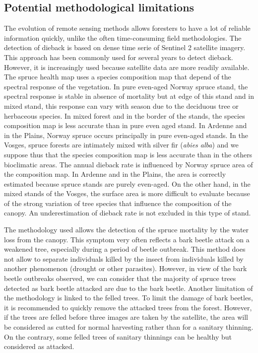 \documentclass[3p,procedia]{elsarticle}
\begin{document}
\subsection{Potential methodological limitations}
The evolution of remote sensing methods allows foresters to have a lot of reliable information quickly, unlike the often time-consuming field methodologies.
The detection of dieback is based on dense time serie of Sentinel 2 satellite imagery. This approach has been commonly used for several years to detect dieback. However, it is increasingly used because satellite data are more readily available.
The spruce health map uses a species composition map that depend of the spectral response of the vegetation.
In pure even-aged Norway spruce stand, the spectral response is stable in absence of mortality but at edge of this stand and in mixed stand, this response can vary with season due to the deciduous tree or herbaceous species.
In mixed forest and in the border of the stands, the species composition map is less accurate than in pure even aged stand.
In Ardenne and in the Plains, Norway spruce occurs principally in pure even-aged stands.
In the Vosges, spruce forests are intimately mixed with silver fir (\textit{abies alba}) and we suppose thus that the species composition map is less accurate than in the others bioclimatic areas.
The annual dieback rate is influenced by Norway spruce area of the composition map.
In Ardenne and in the Plains, the area is correctly estimated because spruce stands are purely even-aged.
On the other hand, in the mixed stands of the Vosges, the surface area is more difficult to evaluate because of the strong variation of tree species that influence the composition of the canopy.
An underestimation of dieback rate is not excluded in this type of stand.

The methodology used allows the detection of the spruce mortality by the water loss from the canopy. This symptom very often reflects a bark beetle attack on a weakened tree, especially during a period of beetle outbreak. This method does not allow to separate individuals killed by the insect from individuals killed by another phenomenon (drought or other parasites). However, in view of the bark beetle outbreaks observed, we can consider that the majority of spruce trees detected as bark beetle attacked are due to the bark beetle.
Another limitation of the methodology is linked to the felled trees.
To limit the damage of bark beetles, it is recommended to quickly remove the attacked trees from the forest.
However, if the trees are felled before three images are taken by the satellite, the area will be considered as cutted for normal harvesting  rather than for a sanitary thinning.
On the contrary, some felled trees of sanitary thinnings can be healthy but considered as attacked.
\end{document}
